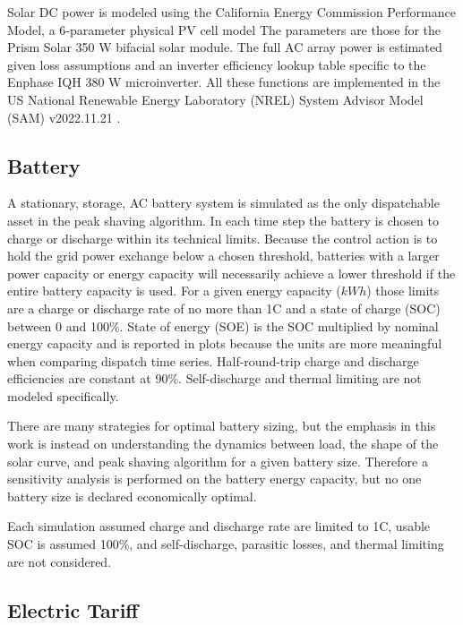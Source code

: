 \documentclass[journal,article,submit,pdftex,moreauthors]{Definitions/mdpi}
\begin{document}
  Solar DC power is modeled using the California Energy Commission Performance Model, a 6-parameter physical PV cell model The parameters are those for the Prism Solar 350 W bifacial solar module. The full AC array power is estimated given loss assumptions and an inverter efficiency lookup table specific to the Enphase IQH 380 W microinverter. All these functions are implemented in the US National Renewable Energy Laboratory (NREL) System Advisor Model (SAM) v2022.11.21 \cite{NREL2022}.

  \subsection{Battery}\label{battery}%

  A stationary, storage, AC battery system is simulated as the only dispatchable asset in the peak shaving algorithm. In each time step the battery is chosen to charge or discharge within its technical limits. Because the control action is to hold the grid power exchange below a chosen threshold, batteries with a larger power capacity or energy capacity will necessarily achieve a lower threshold if the entire battery capacity is used. For a given energy capacity (\(kWh\)) those limits are a charge or discharge rate of no more than 1C and a state of charge (SOC) between 0 and 100\%. State of energy (SOE) is the SOC multiplied by nominal energy capacity and is reported in plots because the units are more meaningful when comparing dispatch time series. Half-round-trip charge and discharge efficiencies are constant at 90\%. Self-discharge and thermal limiting are not modeled specifically.

  There are many strategies for optimal battery sizing, but the emphasis in this work is instead on understanding the dynamics between load, the shape of the solar curve, and peak shaving algorithm for a given battery size. Therefore a sensitivity analysis is performed on the battery energy capacity, but no one battery size is declared economically optimal.

  Each simulation assumed charge and discharge rate are limited to 1C, usable SOC is assumed 100\%, and self-discharge, parasitic losses, and thermal limiting are not considered.

  \subsection{Electric Tariff}\label{electric-tariff}
\end{document}
